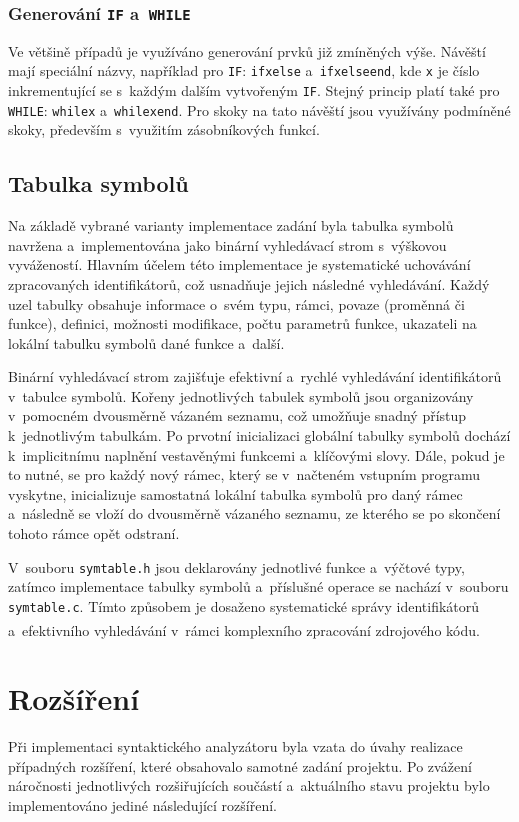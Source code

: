 \documentclass[a4paper, 11pt]{article}
\begin{document}
\subsubsection{Generování \texttt{IF} a~\texttt{WHILE}}
    Ve většině případů je využíváno generování prvků již zmíněných výše.
    Návěští mají speciální názvy, například pro \texttt{IF}: \texttt{ifxelse} a~\texttt{ifxelseend}, kde \texttt{x} je číslo inkrementující se s~každým dalším vytvořeným \texttt{IF}.
    Stejný princip platí také pro \texttt{WHILE}: \texttt{whilex} a~\texttt{whilexend}.
    Pro skoky na tato návěští jsou využívány podmíněné skoky, především s~využitím zásobníkových funkcí.

\subsection{Tabulka symbolů}
    Na základě vybrané varianty implementace zadání byla tabulka symbolů navržena a~implementována jako binární vyhledávací strom s~výškovou vyvážeností. Hlavním účelem této implementace je systematické uchovávání zpracovaných identifikátorů, což usnadňuje jejich následné vyhledávání.
    Každý uzel tabulky obsahuje informace o~svém typu, rámci, povaze (proměnná či funkce), definici, možnosti modifikace, počtu parametrů funkce, ukazateli na lokální tabulku symbolů dané funkce a~další.

    Binární vyhledávací strom zajišťuje efektivní a~rychlé vyhledávání identifikátorů v~tabulce symbolů.
    Kořeny jednotlivých tabulek symbolů jsou organizovány v~pomocném dvousměrně vázaném seznamu, což umožňuje snadný přístup k~jednotlivým tabulkám.
    Po prvotní inicializaci globální tabulky symbolů dochází k~implicitnímu naplnění vestavěnými funkcemi a~klíčovými slovy.
    Dále, pokud je to nutné, se pro každý nový rámec, který se v~načteném vstupním programu vyskytne, inicializuje samostatná lokální tabulka symbolů pro daný rámec a~následně se vloží do dvousměrně vázaného seznamu, ze kterého se po skončení tohoto rámce opět odstraní.
    
    V~souboru \texttt{symtable.h} jsou deklarovány jednotlivé funkce a~výčtové typy, zatímco implementace tabulky symbolů a~příslušné operace se nachází v~souboru \texttt{symtable.c}.
    Tímto způsobem je dosaženo systematické správy identifikátorů a~efektivního vyhledávání v~rámci komplexního zpracování zdrojového kódu\textsuperscript{\cite{IAL}}.

\newpage

\section{Rozšíření}
    Při implementaci syntaktického analyzátoru byla vzata do úvahy realizace případných rozšíření, které obsahovalo samotné zadání projektu.
    Po zvážení náročnosti jednotlivých rozšiřujících součástí a~aktuálního stavu projektu bylo implementováno jediné následující rozšíření.
\end{document}
